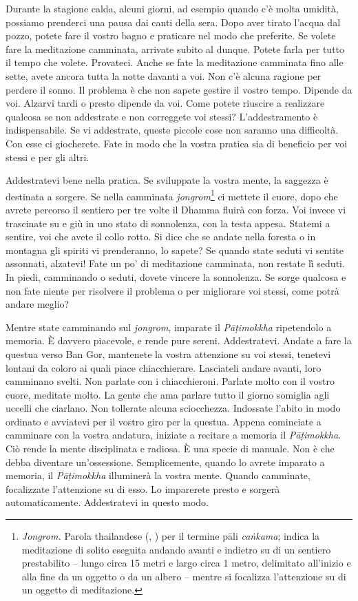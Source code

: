 Durante la stagione calda, alcuni giorni, ad esempio quando c'è molta
umidità, possiamo prenderci una pausa dai canti della sera. Dopo aver
tirato l'acqua dal pozzo, potete fare il vostro bagno e praticare nel
modo che preferite. Se volete fare la meditazione camminata, arrivate
subito al dunque. Potete farla per tutto il tempo che volete. Provateci.
Anche se fate la meditazione camminata fino alle sette, avete ancora
tutta la notte davanti a voi. Non c'è alcuna ragione per perdere il
sonno. Il problema è che non sapete gestire il vostro tempo. Dipende da
voi. Alzarvi tardi o presto dipende da voi. Come potete riuscire a
realizzare qualcosa se non addestrate e non correggete voi stessi?
L'addestramento è indispensabile. Se vi addestrate, queste piccole cose
non saranno una difficoltà. Con esse ci giocherete. Fate in modo che la
vostra pratica sia di beneficio per voi stessi e per gli altri.

Addestratevi bene nella pratica. Se sviluppate la vostra mente, la
saggezza è destinata a sorgere. Se nella camminata
\emph{jongrom}\footnote{\emph{Jongrom.} Parola thailandese (,
  ) per il termine pāli \emph{caṅkama}; indica la meditazione
  di solito eseguita andando avanti e indietro su di un sentiero
  prestabilito -- lungo circa 15 metri e largo circa 1 metro, delimitato
  all'inizio e alla fine da un oggetto o da un albero -- mentre si
  focalizza l'attenzione su di un oggetto di meditazione.} ci mettete il
cuore, dopo che avrete percorso il sentiero per tre volte il Dhamma
fluirà con forza. Voi invece vi trascinate su e giù in uno stato di
sonnolenza, con la testa appesa. Statemi a sentire, voi che avete il
collo rotto. Si dice che se andate nella foresta o in montagna gli
spiriti vi prenderanno, lo sapete? Se quando state seduti vi sentite
assonnati, alzatevi! Fate un po' di meditazione camminata, non restate
lì seduti. In piedi, camminando o seduti, dovete vincere la sonnolenza.
Se sorge qualcosa e non fate niente per risolvere il problema o per
migliorare voi stessi, come potrà andare meglio?

Mentre state camminando sul \emph{jongrom}, imparate il
\emph{Pāṭimokkha} ripetendolo a memoria. È davvero piacevole, e rende
pure sereni. Addestratevi. Andate a fare la questua verso Ban Gor,
mantenete la vostra attenzione su voi stessi, tenetevi lontani da coloro
ai quali piace chiacchierare. Lasciateli andare avanti, loro camminano
svelti. Non parlate con i chiacchieroni. Parlate molto con il vostro
cuore, meditate molto. La gente che ama parlare tutto il giorno somiglia
agli uccelli che ciarlano. Non tollerate alcuna sciocchezza. Indossate
l'abito in modo ordinato e avviatevi per il vostro giro per la questua.
Appena cominciate a camminare con la vostra andatura, iniziate a
recitare a memoria il \emph{Pāṭimokkha}. Ciò rende la mente disciplinata
e radiosa. È una specie di manuale. Non è che debba diventare
un'ossessione. Semplicemente, quando lo avrete imparato a memoria, il
\emph{Pāṭimokkha} illuminerà la vostra mente. Quando camminate,
focalizzate l'attenzione su di esso. Lo imparerete presto e sorgerà
automaticamente. Addestratevi in questo modo.

